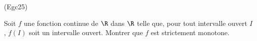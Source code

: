 \begin{tiny}(Egc25)\end{tiny} Soit $f$ une fonction continue de $\R$ dans $\R$ telle que, pour tout intervalle ouvert $I$, $f(I)$ soit un intervalle ouvert. Montrer que $f$ est strictement monotone.  